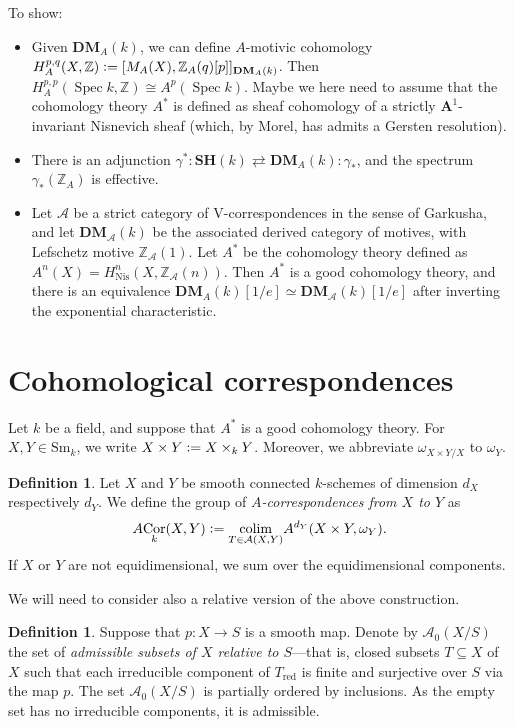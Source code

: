 \documentclass[a4paper, oneside, english,reqno]{amsart}
\theoremstyle{plain}
\theoremstyle{definition}
\newtheorem{definition}[theorem]{Definition}
\theoremstyle{remark}
\newcommand{\defeq}{\vcentcolon=}
\newcommand{\Nis}{\mathrm{Nis}}
\newcommand{\ACor}{A\mkern-3mu\Cor}
\newcommand{\A}{\mathbf{A}}
\newcommand{\calA}{\mathcal{A}}
\newcommand{\DM}{\mathbf{DM}}
\newcommand{\Sm}{\mathrm{Sm}}
\newcommand{\SH}{\mathbf{SH}}
\newcommand{\red}{\mathrm{red}}
\newcommand{\DMA}{{\mathbf{DM}}_A}
\DeclareMathOperator{\Spec}{Spec}
\DeclareMathOperator{\Cor}{Cor}
\DeclareMathOperator{\colim}{colim}
\begin{document}
To show:
\begin{itemize}
\item Given $\DMA(k)$, we can define $A$-motivic cohomology $H_A^{p,q}(X,\mathbb{Z})\defeq[M_A(X),\mathbb{Z}_A(q)[p]]_{\DMA(k)}$. Then $H_A^{p,p}(\Spec k,\mathbb{Z})\cong A^p(\Spec k)$. Maybe we here need to assume that the cohomology theory $A^*$ is defined as sheaf cohomology of a strictly $\A^1$-invariant Nisnevich sheaf (which, by Morel, has admits a Gersten resolution).
\item There is an adjunction $\gamma^*: \SH(k)\rightleftarrows \DMA(k):\gamma_*$, and the spectrum $\gamma_*(\mathbb{Z}_A)$ is effective.
\item Let $\mathscr{A}$ be a strict category of V-correspondences in the sense of Garkusha, and let $\DM_{\mathscr{A}}(k)$ be the associated derived category of motives, with Lefschetz motive $\mathbb{Z}_{\mathscr{A}}(1)$. Let $A^*$ be the cohomology theory defined as $A^n(X)=H^n_{\Nis}(X,\mathbb{Z}_{\mathscr{A}}(n))$. Then $A^*$ is a good cohomology theory, and there is an equivalence $\DMA(k)[1/e]\simeq\DM_{\mathscr{A}}(k)[1/e]$ after inverting the exponential characteristic.
\end{itemize}

\section{Cohomological correspondences}

Let $k$ be a field, and suppose that $A^*$ is a good cohomology theory. For $X,Y\in\Sm_k$, we write $X\times Y\defeq X\times_k Y$. Moreover, we abbreviate $\omega_{X\times Y/X}$ to $\omega_Y$.

\begin{definition}
Let $X$ and $Y$ be smooth connected $k$-schemes of dimension $d_X$ respectively $d_Y$. We define the group of \emph{$A$-correspondences from $X$ to $Y$} as
\[
\ACor_k(X,Y)\defeq\underset{T\in\calA(X,Y)}{\colim}A^{d_Y}(X\times Y,\omega_{Y}).
\]
If $X$ or $Y$ are not equidimensional, we sum over the equidimensional components.
\end{definition}

We will need to consider also a relative version of the above construction.

\begin{definition}
Suppose that $p\colon X\to S$ is a smooth map. Denote by $\calA_0(X/S)$ the set of \emph{admissible subsets of $X$ relative to $S$}---that is, closed subsets $T\subseteq X$ of $X$ such that each irreducible component of $T_\red$ is finite and surjective over $S$ via the map $p$. The set $\calA_0(X/S)$ is partially ordered by inclusions. As the empty set has no irreducible components, it is admissible.
\end{definition}
\end{document}
